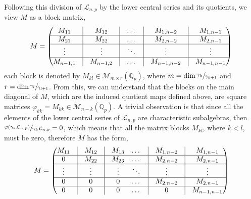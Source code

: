 \documentclass[12pt]{article}
\begin{document}
Following this division of $\mathcal{L}_{n,p}$ by the lower central series and its quotients, we view $M$ as a block matrix, \[M=\begin{pmatrix}
M_{11} & \vline & M_{12}&\vline & \dots& \vline & M_{1,n-2} & \vline&M_{1,n-1}\\
\hline
M_{21} & \vline & M_{22}&\vline & \dots &\vline & M_{2,n-2} &\vline& M_{2,n-1}\\
\hline
\vdots & \vline & \vdots&\vline & \ddots &\vline & \vdots &\vline& \vdots\\
\hline
M_{n-1,1} & \vline & M_{n-1,2}&\vline & \dots &\vline & M_{n-1,n-2} &\vline& M_{n-1,n-1}\\
\end{pmatrix}\]
each block is denoted by $M_{kl}\in\mathcal{M}_{m\times{r}}(\mathbb{Q}_p)$, where $m=\dim\sfrac{\gamma_k}{\gamma_{k+1}}$ and $r=\dim\sfrac{\gamma_l}{\gamma_{l+1}}$. From this, we can understand that the blocks on the main diagonal of $M$, which are the induced quotient maps defined above, are square matrices $\varphi_{kk}=M_{kk}\in\mathcal{M}_{n-k}(\mathbb{Q}_p)$. A trivial observation is that since all the elements of the lower central series of $\mathcal{L}_{n,p}$ are characteristic subalgebras, then $\sfrac{\varphi(\gamma_k\mathcal{L}_{n,p})}{\gamma_k\mathcal{L}_{n,p}}=0$, which means that all the matrix blocks $M_{kl}$, where $k<l$, must be zero, therefore $M$ has the form, \[M=\begin{pmatrix}
M_{11} & \vline & M_{12}&\vline & M_{13} & \dots& \vline & M_{1,n-2} & \vline&M_{1,n-1}\\
\hline
0 & \vline & M_{22}&\vline & M_{23} & \dots &\vline & M_{2,n-2} &\vline& M_{2,n-1}\\
\hline
\vdots & \vline & \vdots&\vline & \vdots & \ddots &\vline & \vdots &\vline& \vdots\\
\hline
0 & \vline & 0&\vline & 0 & \dots &\vline & M_{2,n-2} &\vline& M_{2,n-1}\\
\hline
0 & \vline & 0 &\vline & 0 & \dots &\vline & 0 &\vline& M_{n-1,n-1}\\
\end{pmatrix}
\]
\end{document}
